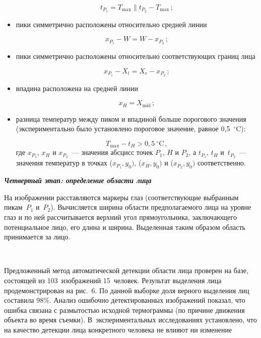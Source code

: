 \begin{multicols}{2}
\begin{itemize}
\noindent
$$
t_{P_1}=T_{\max}\parallel t_{P_2} -T_{\max}\,;
$$
\item пики симметрично расположены относительно средней линии

\noindent
$$
x_{P_1}-W=W-x_{P_2}\,;
$$
\item пики симметрично расположены относительно соответствующих 
границ лица

\noindent
$$
x_{P_1}-X_l=X_r-x_{P_2}\,;
$$
\item впадина расположена на средней линии

\noindent
$$
x_H=X_{\mathrm{mid}}\,;
$$
\item разница температур между пиком и впадиной больше порогового 
значения (экспериментально было установлено пороговое значение, равное 
0,5~$^\circ$C):

\noindent
$$
T_{\max}-t_H>0{,}5~^\circ\mathrm{C}\,,
$$
где $x_{P_1}$, $x_H$ и $x_{P_2}$~--- значения абсцисс точек $P_1$, $H$ и $P_2$, а
$t_{P_1}$, $t_H$ и~$t_{P_2}$~--- значения температур в точках ($x_{P_1}, y_0)$, ($x_H, y_0)$ и
($x_{P_2}, y_0)$ соответственно.
\end{itemize}

\medskip

  \noindent
    {\bfseries\textit{Четвертый этап: определение области лица}}
 \smallskip
  
    На изображении расставляются маркеры глаз (соответствующие выбранным 
пикам~$P_1$ и~$P_2$). Вычисляется ширина области предполагаемого лица
на уровне глаз и по ней рассчитывается верхний
 угол прямоугольника, заключающего потенциальное лицо, его длина и ширина. Выделенная таким 
образом область принимается за лицо.

\setcounter{figure}{6}
\begin{figure*} %
    \vspace*{1pt}
\begin{center}
\mbox{%
\epsfxsize=162.7mm
}
\end{center}
\vspace*{-6pt}
\end{figure*}
  
  
  Предложенный метод автоматической детекции области лица проверен на базе, 
состоящей из 103~изображений 15~человек. Результат выделения лица 
продемонстрирован на рис.~6. По данной выборке доля верного 
выделения лиц составила 98\%. Анализ ошибочно детектированных изображений 
показал, что ошибка связана с размытостью исходной термограммы (по причине 
движения объекта во время съемки). В~экспериментальных исследованиях 
установлено, что на качество детекции лица конкретного человека не влияют ни 
изменение\linebreak\vspace*{-16pt}


\end{multicols}
